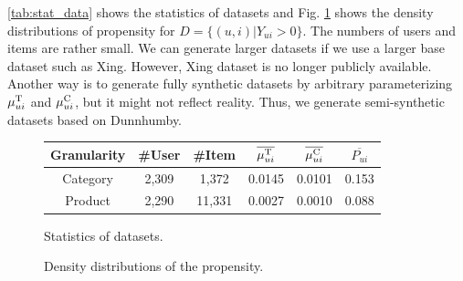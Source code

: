 \documentclass[manuscript,screen]{acmart}
\begin{document}
 \ref{tab:stat_data} shows the statistics of datasets and Fig. \ref{fig:propensity_dist} shows the density distributions of propensity for $D = \{(u,i) |Y_{ui} > 0 \}$.
The numbers of users and items are rather small. 
We can generate larger datasets if we use a larger base dataset such as Xing.
However, Xing dataset is no longer publicly available.
Another way is to generate fully synthetic datasets by arbitrary parameterizing $\mu_{ui}^\textnormal{T}$ and $\mu_{ui}^\textnormal{C}$, but it might not reflect reality.
Thus, we generate semi-synthetic datasets based on Dunnhumby.

\begin{figure}[htbp]
	\centering
	\setlength{\tabcolsep}{3pt} 
	\begin{minipage}{0.48\textwidth}
		\centering
		\captionsetup{type=table} %
		\begin{tabular}{cccccc}
			\toprule
			Granularity & \#User & \#Item & $\overline{\mu_{ui}^\textnormal{T}}$ & $\overline{\mu_{ui}^\textnormal{C}}$ & $\overline{P_{ui}}$ \\
			\midrule
			Category & 2,309 & 1,372 & 0.0145 & 0.0101 & 0.153\\
			Product & 2,290 & 11,331 & 0.0027 & 0.0010 & 0.088\\
			\bottomrule
		\end{tabular}
		\caption{Statistics of datasets.}
		\label{tab:stat_data}
	\end{minipage}
	\begin{minipage}{0.5\textwidth}
		\centering
		\caption{Density distributions of the propensity.}
		\label{fig:propensity_dist}
	\end{minipage}
\end{figure}
\end{document}
